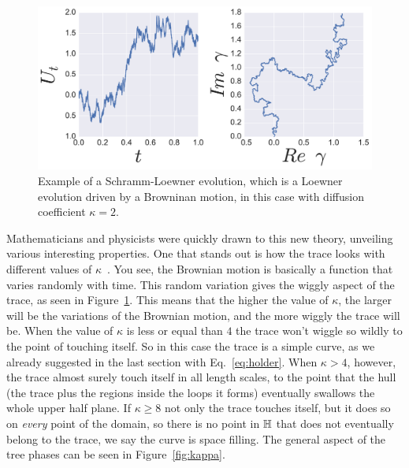 \begin{figure}[b]
\begin{center}
    \includegraphics[width=\textwidth]{chapters/ch4-sle/figs/sleexample}
\end{center}
\caption{Example of a Schramm-Loewner evolution, which is a Loewner evolution
    driven by a Browninan motion, in this case with diffusion coefficient
    $\kappa=2$.}
\label{fig:sleexample}
\end{figure}


Mathematicians and physicists were quickly drawn to this new theory, unveiling
various interesting properties. One that stands out is how the trace looks with
different values of $\kappa$~\cite{Rohde2011}. You see, the Brownian motion is
basically a function that varies randomly with time. This random variation
gives the wiggly aspect of the trace, as seen in Figure~\ref{fig:sleexample}.
This means that the higher the value of $\kappa$, the larger will be the
variations of the Brownian motion, and the more wiggly the trace will be. When
the value of $\kappa$ is less or equal than $4$ the trace won't wiggle so
wildly to the point of touching itself. So in this case the trace is a simple
curve, as we already suggested in the last section with Eq.~\ref{eq:holder}.
When $\kappa>4$, however, the trace almost surely touch itself in all length
scales, to the point that the hull (the trace plus the regions inside the loops
it forms) eventually swallows the whole upper half plane. If $\kappa\geq8$ not
only the trace touches itself, but it does so on \textit{every} point of the
domain, so there is no point in $\mathbb{H}$ that does not eventually belong to the
trace, we say the curve is space filling. The general aspect of the tree phases
can be seen in Figure~\ref{fig:kappa}.

